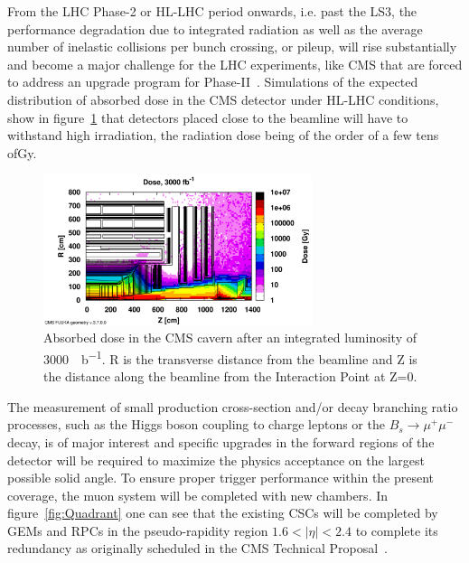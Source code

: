 From the LHC Phase-2 or \acf{HL-LHC} period onwards, i.e. past the \acf{LS3}, the performance degradation due to integrated radiation as well as the average number of inelastic collisions per bunch crossing, or pileup, will rise substantially and become a major challenge for the LHC experiments, like CMS that are forced to address an upgrade program for Phase-II~\cite{PHASEIITP}. Simulations of the expected distribution of absorbed dose in the CMS detector under HL-LHC conditions, show in figure~\ref{fig:Dose} that detectors placed close to the beamline will have to withstand high irradiation, the radiation dose being of the order of a few tens of\si{Gy}.

\begin{figure}[H]
	\centering
	\includegraphics[width=0.7\textwidth]{fig/chapt2/HL-LHC-Dose.png}
	\caption{\label{fig:Dose} Absorbed dose in the CMS cavern after an integrated luminosity of \SI{3000}{\femto\per\barn}. R is the transverse distance from the beamline and Z is the distance along the beamline from the Interaction Point at Z=0.}
\end{figure}

The measurement of small production cross-section and/or decay branching ratio processes, such as the Higgs boson coupling to charge leptons or the $B_s \longrightarrow \mu^+\mu^-$ decay, is of major interest and specific upgrades in the forward regions of the detector will be required to maximize the physics acceptance on the largest possible solid angle. To ensure proper trigger performance within the present coverage, the muon system will be completed with new chambers. In figure~\ref{fig:Quadrant} one can see that the existing \acfp{CSC} will be completed by \acfp{GEM} and \acfp{RPC} in the pseudo-rapidity region $1.6<\vert\eta\vert<2.4$ to complete its redundancy as originally scheduled in the CMS Technical Proposal~\cite{CMSTP}.

